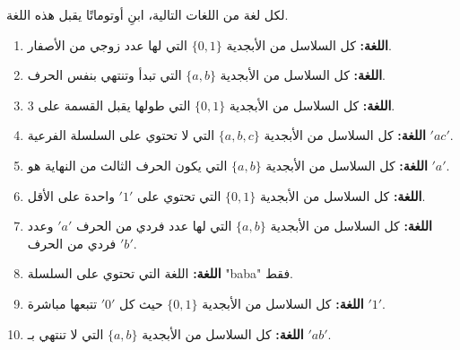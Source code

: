\documentclass[12pt]{article}
\begin{document}
لكل لغة من اللغات التالية، ابنِ أوتوماتًا يقبل هذه اللغة.

\begin{enumerate}

\item
\textbf{اللغة:} كل السلاسل من الأبجدية $\{0, 1\}$ التي لها عدد زوجي من الأصفار.

\item
\textbf{اللغة:} كل السلاسل من الأبجدية $\{a, b\}$ التي تبدأ وتنتهي بنفس الحرف.

\item
\textbf{اللغة:} كل السلاسل من الأبجدية $\{0, 1\}$ التي طولها يقبل القسمة على 3.

\item
\textbf{اللغة:} كل السلاسل من الأبجدية $\{a, b, c\}$ التي لا تحتوي على السلسلة الفرعية $'ac'$.

\item
\textbf{اللغة:} كل السلاسل من الأبجدية $\{a, b\}$ التي يكون الحرف الثالث من النهاية هو $'a'$.

\item
\textbf{اللغة:} كل السلاسل من الأبجدية $\{0, 1\}$ التي تحتوي على $'1'$ واحدة على الأقل.

\item
\textbf{اللغة:} كل السلاسل من الأبجدية $\{a, b\}$ التي لها عدد فردي من الحرف $'a'$ وعدد فردي من الحرف $'b'$.

\item
\textbf{اللغة:} اللغة التي تحتوي على السلسلة "baba" فقط.

\item
\textbf{اللغة:} كل السلاسل من الأبجدية $\{0, 1\}$ حيث كل $'0'$ تتبعها مباشرة $'1'$.

\item
\textbf{اللغة:} كل السلاسل من الأبجدية $\{a, b\}$ التي لا تنتهي بـ $'ab'$.

\end{enumerate}
\end{document}
